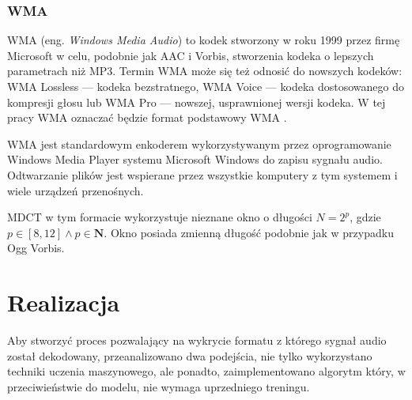 \documentclass[pl,12pt]{aghdpl}
\let\Oldchapter\chapter%
\renewcommand{\chapter}{\FloatBarrier\Oldchapter}
\let\Oldsubsection\subsection%
\renewcommand{\subsection}{\FloatBarrier\Oldsubsection}
\begin{document}
\subsection{WMA}

WMA (eng. \textit{Windows Media Audio}) to kodek stworzony w roku 1999 przez
firmę Microsoft w celu, podobnie jak AAC i Vorbis, stworzenia kodeka o lepszych
parametrach niż MP3. Termin WMA może się też odnosić do nowszych kodeków: WMA
Lossless --- kodeka bezstratnego, WMA Voice --- kodeka dostosowanego do
kompresji głosu lub WMA Pro --- nowszej, usprawnionej wersji kodeka. W tej
pracy WMA oznaczać będzie format podstawowy WMA
\cite{AvelarMorrissetteForbesAlbert2008}.

WMA jest standardowym enkoderem wykorzystywanym przez oprogramowanie Windows
Media Player systemu Microsoft Windows do zapisu sygnału audio. Odtwarzanie
plików jest wspierane przez wszystkie komputery z tym systemem i wiele urządzeń
przenośnych.

MDCT w tym formacie wykorzystuje nieznane okno o długości $N = 2^p$, gdzie $p
\in [8,12] \land p \in\bm N$. Okno posiada zmienną długość podobnie jak w
przypadku Ogg Vorbis.

\chapter{Realizacja}
Aby stworzyć proces pozwalający na wykrycie formatu z którego sygnał audio
został dekodowany, przeanalizowano dwa podejścia, nie tylko wykorzystano
techniki uczenia maszynowego, ale ponadto, zaimplementowano algorytm który, w
przeciwieństwie do modelu, nie wymaga uprzedniego treningu.
\end{document}

